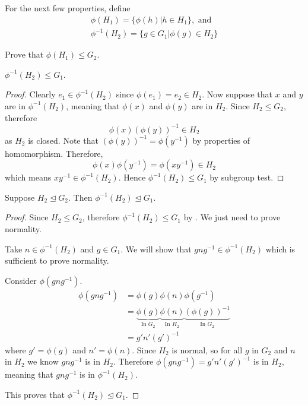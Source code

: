 \newpage

For the next few properties, define
\begin{gather*}
    \phi(H_1) = \{\phi(h) \vert h \in H_1\}, \text{ and}\\
    \phi^{-1}(H_2) = \{g \in G_1 \vert \phi(g) \in H_2\}
\end{gather*}

\begin{exercise}
    Prove that $\phi(H_1) \leq G_2$.
\end{exercise}

\begin{proposition}\label{prop-homomorphism-inverse-is-subgroup}
    $\phi^{-1}(H_2) \leq G_1$.
\end{proposition}
\begin{proof}
    Clearly $e_1 \in \phi^{-1}(H_2)$ since $\phi(e_1) = e_2 \in H_2$. Now suppose that $x$ and $y$ are in $\phi^{-1}(H_2)$, meaning that $\phi(x)$ and $\phi(y)$ are in $H_2$. Since $H_2 \leq G_2$, therefore
    \[
        \phi(x)\left(\phi(y)\right)^{-1} \in H_2
    \]
    as $H_2$ is closed. Note that $\left(\phi(y)\right)^{-1} = \phi(y^{-1})$ by properties of homomorphism. Therefore,
    \[
        \phi(x)\phi(y^{-1}) = \phi(xy^{-1}) \in H_2
    \]
    which means $xy^{-1} \in \phi^{-1}(H_2)$. Hence $\phi^{-1}(H_2) \leq G_1$ by subgroup test.
\end{proof}

\begin{proposition}
    Suppose $H_2 \unlhd G_2$. Then $\phi^{-1}(H_2) \unlhd G_1$.
\end{proposition}
\begin{proof}
    Since $H_2 \leq G_2$, therefore $\phi^{-1}(H_2) \leq G_1$ by . We just need to prove normality.

    Take $n \in \phi^{-1}(H_2)$ and $g \in G_1$. We will show that $gng^{-1} \in \phi^{-1}(H_2)$ which is sufficient to prove normality.

    Consider $\phi(gng^{-1})$.
    \begin{align*}
        \phi(gng^{-1}) &= \phi(g)\phi(n)\phi(g^{-1}) \\
        &= \underbrace{\phi(g)}_{\text{In }G_2} \underbrace{\phi(n)}_{\text{In }H_2} \underbrace{\left(\phi(g)\right)^{-1}}_{\text{In }G_2}\\
        &= g'n'(g')^{-1}
    \end{align*}
    where $g' = \phi(g)$ and $n' = \phi(n)$. Since $H_2$ is normal, so for all $g$ in $G_2$ and $n$ in $H_2$ we know $gng^{-1}$ is in $H_2$. Therefore $\phi(gng^{-1}) = g'n'(g')^{-1}$ is in $H_2$, meaning that $gng^{-1}$ is in $\phi^{-1}(H_2)$.

    This proves that $\phi^{-1}(H_2) \unlhd G_1$.
\end{proof}

